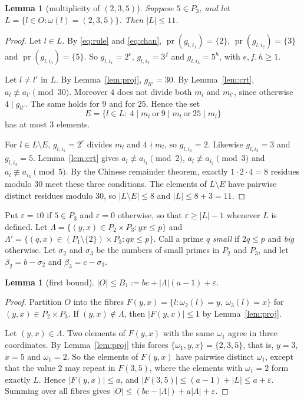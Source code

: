 \documentclass[11pt]{article}
\newtheorem{lemma}[theorem]{Lemma}
\theoremstyle{definition}
\theoremstyle{remark}
\newcommand{\pr}{\operatorname{pr}}
\begin{document}
\begin{lemma}[multiplicity of $(2,3,5)$]\label{lem:mult}
Suppose $5\in P_3$, and let $L=\{l\in O:\omega(l)=(2,3,5)\}$. Then $|L|\le11$.
\end{lemma}
\begin{proof}
Let $l\in L$. By \eqref{eq:rule} and \eqref{eq:chan}, $\pr(g_{l,i_1})=\{2\}$,
$\pr(g_{l,i_2})=\{3\}$ and $\pr(g_{l,i_3})=\{5\}$. So $g_{l,i_1}=2^{e}$, $g_{l,i_2}=3^{f}$ and
$g_{l,i_3}=5^{h}$, with $e,f,h\ge1$.

Let $l\ne l'$ in $L$. By Lemma~\ref{lem:proj}, $g_{ll'}=30$. By Lemma~\ref{lem:crt},
$a_l\not\equiv a_{l'}\pmod{30}$. Moreover $4$ does not divide both $m_l$ and $m_{l'}$, since
otherwise $4\mid g_{ll'}$. The same holds for $9$ and for $25$. Hence the set
\[
E=\{l\in L:\ 4\mid m_l\ \text{or}\ 9\mid m_l\ \text{or}\ 25\mid m_l\}
\]
has at most $3$ elements.

For $l\in L\setminus E$, $g_{l,i_1}=2^e$ divides $m_l$ and $4\nmid m_l$, so $g_{l,i_1}=2$.
Likewise $g_{l,i_2}=3$ and $g_{l,i_3}=5$. Lemma~\ref{lem:crt} gives
$a_l\not\equiv a_{i_1}\pmod2$, $a_l\not\equiv a_{i_2}\pmod3$ and $a_l\not\equiv a_{i_3}\pmod5$. By the
Chinese remainder theorem, exactly $1\cdot2\cdot4=8$ residues modulo $30$ meet these three
conditions. The elements of $L\setminus E$ have pairwise distinct residues modulo $30$, so
$|L\setminus E|\le8$ and $|L|\le 8+3=11$.
\end{proof}

Put $\varepsilon=10$ if $5\in P_3$ and $\varepsilon=0$ otherwise, so that $\varepsilon\ge|L|-1$
whenever $L$ is defined. Let
$\Lambda=\{(y,x)\in P_2\times P_3: yx\le p\}$ and
$\Lambda'=\{(q,x)\in(P_1\setminus\{2\})\times P_3: qx\le p\}$. Call a prime $q$ \emph{small} if
$2q\le p$ and \emph{big} otherwise. Let $\sigma_2$ and $\sigma_3$ be the numbers of small primes
in $P_2$ and $P_3$, and let $\beta_2=b-\sigma_2$ and $\beta_3=c-\sigma_3$.

\begin{lemma}[first bound]\label{lem:B1}
$|O|\le B_1:=bc+|\Lambda|(a-1)+\varepsilon$.
\end{lemma}
\begin{proof}
Partition $O$ into the fibres $F(y,x)=\{l:\omega_2(l)=y,\ \omega_3(l)=x\}$ for
$(y,x)\in P_2\times P_3$. If $(y,x)\notin\Lambda$, then $|F(y,x)|\le1$ by Lemma~\ref{lem:proj}.

Let $(y,x)\in\Lambda$. Two elements of $F(y,x)$ with the same $\omega_1$ agree in three
coordinates. By Lemma~\ref{lem:proj} this forces $\{\omega_1,y,x\}=\{2,3,5\}$, that is, $y=3$,
$x=5$ and $\omega_1=2$. So the elements of $F(y,x)$ have pairwise distinct $\omega_1$, except
that the value $2$ may repeat in $F(3,5)$, where the elements with $\omega_1=2$ form exactly $L$.
Hence $|F(y,x)|\le a$, and $|F(3,5)|\le(a-1)+|L|\le a+\varepsilon$. Summing over all fibres gives
$|O|\le(bc-|\Lambda|)+a|\Lambda|+\varepsilon$.
\end{proof}
\end{document}
